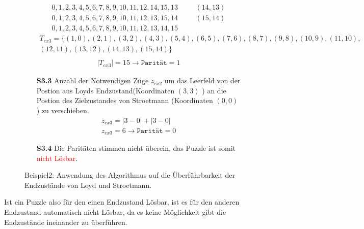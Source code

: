 \begin{figure}[H]
\begin{enumerate}
\begin{align*}
			      0,1,2,3,4,5,6,7,8,9,10,11,12,14,15,13 & \hspace{20pt} (14,13) \\
			      0,1,2,3,4,5,6,7,8,9,10,11,12,13,15,14 & \hspace{20pt} (15,14) \\
			      0,1,2,3,4,5,6,7,8,9,10,11,12,13,14,15
		      \end{align*}
		      \begin{align*}
			      T_{ex3} = \{(1,0),(2,1),(3,2),(4,3),(5,4),(6,5),(7,6),(8,7),(9,8),(10,9),(11,10), \\(12,11),(13,12),(14,13),(15,14)\}\\
		      \end{align*}
		      \begin{align*}
			      \left\vert T_{ex3}\right\vert = 15 \rightarrow \texttt{Parität} = 1
		      \end{align*}
		\item[\textbf{S3.3}] Anzahl der Notwendigen Züge $z_{ex2}$ um das Leerfeld von der Postion aus Loyds Endzustand(Koordinaten $(3,3)$ ) an die Postion des Zielzustandes von Stroetmann (Koordinaten $(0,0)$) zu verschieben.
		      \begin{align*}
			      z_{ex3} = \left | 3 - 0 \right | + \left | 3 - 0 \right | \\
			      z_{ex3} = 6 \rightarrow \texttt{Parität} = 0
		      \end{align*}
		\item[\textbf{S3.4}] Die Paritäten stimmen nicht überein, das Puzzle ist somit \textcolor{red}{nicht Lösbar}.
	\end{enumerate}
	\caption{Beispiel2: Anwendung des Algorithmus auf die Überführbarkeit der Endzustände von Loyd und Stroetmann. \label{fig:Ex3_algo}}
\end{figure}
Ist ein Puzzle also für den einen Endzustand Lösbar, ist es für den anderen Endzustand automatisch nicht Lösbar, da es keine Möglichkeit gibt die Endzustände ineinander zu überführen.

